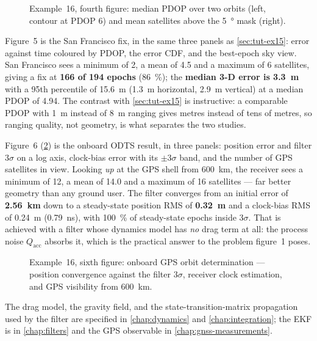 \begin{figure}[htbp]
  \centering
  \caption{Example~16, fourth figure: median PDOP over two orbits (left,
           contour at PDOP 6) and mean satellites above the \SI{5}{\degree}
           mask (right).}
  \label{fig:tut-ex16-pdop}
\end{figure}

Figure~5 is the San Francisco fix, in the same three panels as
\cref{sec:tut-ex15}: error against time coloured by PDOP, the error CDF, and the
best-epoch sky view. San Francisco sees a minimum of 2, a mean of 4.5 and a
maximum of 6 satellites, giving a fix at \textbf{166 of 194 epochs}
(\SI{86}{\percent}); the \textbf{median 3-D error is \SI{3.3}{\meter}} with a
95th percentile of \SI{15.6}{\meter} (\SI{1.3}{\meter} horizontal,
\SI{2.9}{\meter} vertical) at a median PDOP of 4.94. The contrast with
\cref{sec:tut-ex15} is instructive: a comparable PDOP with \SI{1}{\meter}
instead of \SI{8}{\meter} ranging gives metres instead of tens of metres, so
ranging quality, not geometry, is what separates the two studies.

Figure~6 (\cref{fig:tut-ex16-odts}) is the onboard ODTS result, in three panels:
position error and filter $3\sigma$ on a log axis, clock-bias error with its
$\pm3\sigma$ band, and the number of GPS satellites in view. Looking \emph{up}
at the GPS shell from \SI{600}{\kilo\meter}, the receiver sees a minimum of 12,
a mean of 14.0 and a maximum of 16 satellites --- far better geometry than any
ground user. The filter converges from an initial error of
\textbf{\SI{2.56}{\kilo\meter}} down to a steady-state position RMS of
\textbf{\SI{0.32}{\meter}} and a clock-bias RMS of \SI{0.24}{\meter}
(\SI{0.79}{\nano\second}), with \SI{100}{\percent} of steady-state epochs inside
$3\sigma$. That is achieved with a filter whose dynamics model has \emph{no}
drag term at all: the process noise $Q_\mathrm{acc}$ absorbs it, which is the
practical answer to the problem figure~1 poses.

\begin{figure}[htbp]
  \centering
  \caption{Example~16, sixth figure: onboard GPS orbit determination ---
           position convergence against the filter $3\sigma$, receiver clock
           estimation, and GPS visibility from \SI{600}{\kilo\meter}.}
  \label{fig:tut-ex16-odts}
\end{figure}

The drag model, the gravity field, and the state-transition-matrix propagation
used by the filter are specified in \cref{chap:dynamics} and
\cref{chap:integration}; the EKF is in \cref{chap:filters} and the GPS
observable in \cref{chap:gnss-measurements}.

